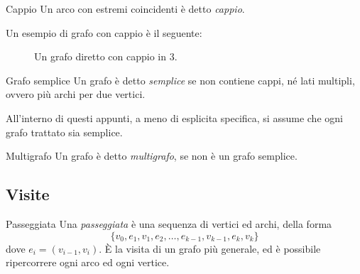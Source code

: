 \documentclass[a4paper, 12pt]{report}
\begin{document}
    \begin{frameddefn}{Cappio}
        Un arco con estremi coincidenti è detto \textit{cappio}.
    \end{frameddefn}

    \begin{example}
        Un esempio di grafo con cappio è il seguente:

        \begin{figure}[H]
            \centering
            \caption{Un grafo diretto con cappio in 3.}
        \end{figure}
    \end{example}

    \begin{frameddefn}{Grafo semplice}
        Un grafo è detto \textit{semplice} se non contiene cappi, né lati multipli, ovvero più archi per due vertici.

        All'interno di questi appunti, a meno di esplicita specifica, si assume che ogni grafo trattato sia semplice.
    \end{frameddefn}

    \begin{frameddefn}{Multigrafo}
        Un grafo è detto \textit{multigrafo}, se non è un grafo semplice.
    \end{frameddefn}

    \subsection{Visite}

    \begin{frameddefn}{Passeggiata}
        Una \textit{passeggiata} è una sequenza di vertici ed archi, della forma $$\{v_0, e_1, v_1, e_2, \ldots , e_{k - 1}, v_{k - 1}, e_k, v_k\}$$ dove $e_i=(v_{i - 1}, v_i)$. È la visita di un grafo più generale, ed è possibile ripercorrere ogni arco ed ogni vertice.
    \end{frameddefn}
\end{document}
